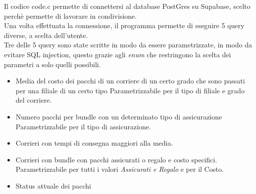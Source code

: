 Il codice code.c permette di connettersi al database PostGres su Supabase, scelto perchè permette di lavorare in condivisione.\\
Una volta effettuata la connessione, il programma permette di eseguire 5 query diverse, a scelta dell'utente.\\
Tre delle 5 query sono state scritte in modo da essere parametrizzate, in modo da evitare SQL injection, questo grazie agli \textit{enum} che restringono la scelta dei parametri a solo quelli possibili.
\begin{itemize}
            \setlength{\itemindent}{+.2in}
            \item Media del costo dei pacchi di un corriere di un certo grado che sono passati per una filiale di un certo tipo
                  Parametrizzabile per il tipo di filiale e grado del corriere.
            \item Numero pacchi per bundle con un determinato tipo di assicurazione
                  Parametrizzabile per il tipo di assicurazione.
            \item Corrieri con tempi di consegna maggiori alla media.
            \item Corrieri con bundle con pacchi assicurati o regalo e costo specifici. 
                Parametrizzabile per tutti i valori \textit{Assicurati e Regalo} e per il Costo.
            \item Status attuale dei pacchi
\end{itemize}
